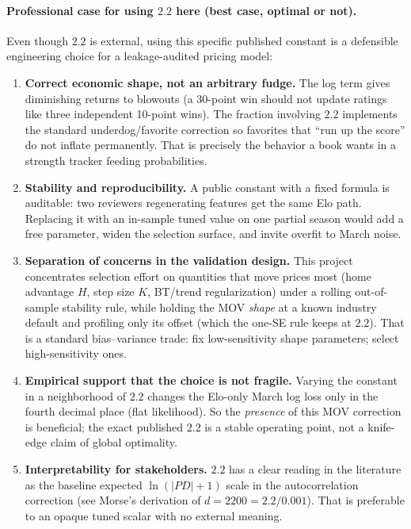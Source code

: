 \documentclass[10pt]{article}
\begin{document}
\paragraph{Professional case for using \(2.2\) here (best case, optimal or not).}
Even though \(2.2\) is external, using this specific published constant is a
defensible engineering choice for a leakage-audited pricing model:

\begin{enumerate}
\item \textbf{Correct economic shape, not an arbitrary fudge.}
The log term gives diminishing returns to blowouts (a 30-point win should not
update ratings like three independent 10-point wins). The fraction involving
\(2.2\) implements the standard underdog/favorite correction so favorites that
``run up the score'' do not inflate permanently. That is precisely the
behavior a book wants in a strength tracker feeding probabilities.
\item \textbf{Stability and reproducibility.}
A public constant with a fixed formula is auditable: two reviewers regenerating
features get the same Elo path. Replacing it with an in-sample tuned value on
one partial season would add a free parameter, widen the selection surface, and
invite overfit to March noise.
\item \textbf{Separation of concerns in the validation design.}
This project concentrates selection effort on quantities that move prices most
(home advantage \(H\), step size \(K\), BT/trend regularization) under a rolling
out-of-sample stability rule, while holding the MOV \emph{shape} at a known
industry default and profiling only its offset (which the one-SE rule keeps at
\(2.2\)). That is a standard bias--variance trade: fix low-sensitivity shape
parameters; select high-sensitivity ones.
\item \textbf{Empirical support that the choice is not fragile.}
Varying the constant in a neighborhood of \(2.2\) changes the Elo-only March log
loss only in the fourth decimal place (flat likelihood). So the \emph{presence}
of this MOV correction is beneficial; the exact published \(2.2\) is a stable
operating point, not a knife-edge claim of global optimality.
\item \textbf{Interpretability for stakeholders.}
\(2.2\) has a clear reading in the literature as the baseline expected
\(\ln(|PD|+1)\) scale in the autocorrelation correction (see Morse's
derivation of \(d=2200=2.2/0.001\)). That is preferable to an opaque
tuned scalar with no external meaning.
\end{enumerate}
\end{document}
